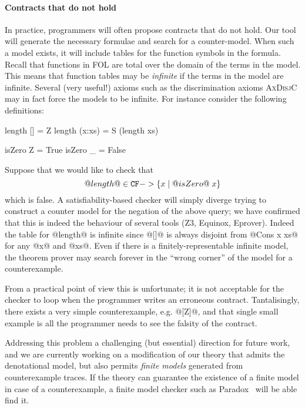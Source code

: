 \paragraph{Contracts that do not hold}
\label{ssect:countersat}

In practice, programmers will often propose contracts that do not hold. Our tool 
will generate the necessary formulae and search for a counter-model. When such a model 
exists, it will include tables for the function symbols in the formula. Recall that
functions in FOL are total over the domain of the terms in the model. This means that function 
tables may be {\em infinite} if the terms in the model are infinite. Several (very useful!) 
axioms such as the discrimination axioms \textsc{AxDisjC} may in fact force the models to be 
infinite. For instance consider the following definitions:
\begin{code}
  length [] = Z
  length (x:xs) = S (length xs)

  isZero Z = True
  isZero _ = False
\end{code}
Suppose that we would like to check that 
   \[ @length@ \in {\tt CF} -> \{ x \mid @isZero@\;x\} \]
which is false.  A satisfiability-based checker 
will simply diverge trying to construct a counter model for the negation of the above query; we 
have confirmed that this is indeed the behaviour of several tools (Z3, Equinox, Eprover).
Indeed the table for @length@ is infinite since @[]@ is always disjoint from @Cons x xs@ for 
any @x@ and @xs@. Even if there is a finitely-representable infinite model, 
the theorem prover may search forever in the ``wrong corner'' of the model for a 
counterexample. 

From a practical point of view this is unfortunate; it is not
acceptable for the checker to loop when the programmer writes an
erroneous contract.
Tantalisingly, there exists a very simple 
counterexample, e.g. @[Z]@, and that single small
example is all the programmer needs to see the falsity of the contract.

Addressing this problem a challenging (but essential) 
direction for future work, and we are currently 
working on a modification of our theory that admits the denotational model, but 
also permits {\em finite models} generated from counterexample traces.
If the theory can guarantee the existence of a finite model in case of a counterexample,
a finite model checker such as Paradox~\cite{paradox} will be able find it.

